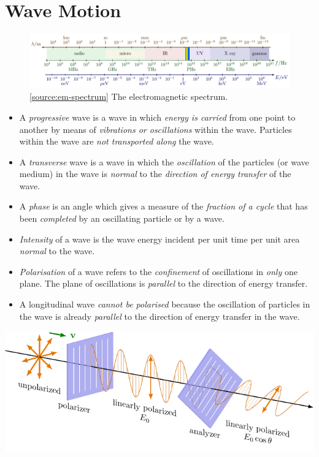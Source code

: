 \documentclass[oneside]{book}
\begin{document}
\chapter{Wave Motion}
\begin{figure}[H]
    \centering
    \includegraphics[width=\textwidth]{../images/em-spectrum/em-spectrum.pdf}
    \caption{\ref{source:em-spectrum} The electromagnetic spectrum.}
    \label{fig:em-spectrum}
\end{figure}
\begin{itemize}
    \item A \emph{progressive} wave is a wave in which \emph{energy is carried} from one point to another by means of \emph{vibrations or oscillations} within the wave. Particles within the wave are \emph{not transported along} the wave.
    \item A \emph{transverse} wave is a wave in which the \emph{oscillation} of the particles (or wave
    medium) in the wave is \emph{normal} to the \emph{direction of energy transfer} of the wave.
    \item A \emph{phase} is an angle which gives a measure of the \emph{fraction of a cycle} that has been \emph{completed} by an oscillating particle or by a wave.
    \item \emph{Intensity} of a wave is the wave energy incident per unit time per unit area \emph{normal} to the wave.
    \item \emph{Polarisation} of a wave refers to the \emph{confinement} of oscillations in \emph{only} one plane. The plane of oscillations is \emph{parallel} to the direction of energy transfer.  
    \item A longitudinal wave \emph{cannot be polarised} because the oscillation of particles in the wave is already \emph{parallel} to the direction of energy transfer in the wave.
\end{itemize}
\begin{minipage}{3cm+15.2363pt}
    \includegraphics[page=4]{../images/Malus'-Law/Malus'-Law.pdf}
\end{minipage}%
\end{document}
